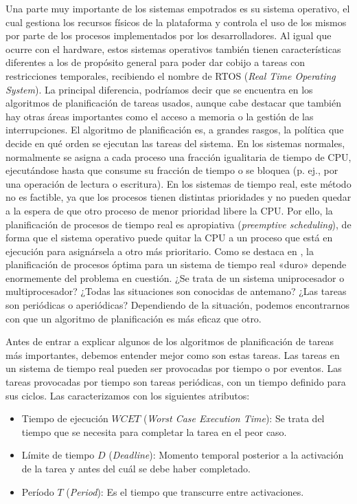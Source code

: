 Una parte muy importante de los sistemas empotrados es su sistema operativo, el
cual gestiona los recursos físicos de la plataforma y controla el uso de los
mismos por parte de los procesos implementados por los desarrolladores. Al igual
que ocurre con el hardware, estos sistemas operativos también tienen
características diferentes a los de propósito general para poder dar cobijo a
tareas con restricciones temporales, recibiendo el nombre de RTOS (\textit{Real
  Time Operating System}). La principal diferencia, podríamos decir que se
encuentra en los algoritmos de planificación de tareas usados, aunque cabe
destacar que también hay otras áreas importantes como el acceso a memoria o la
gestión de las interrupciones. El algoritmo de planificación es, a grandes
rasgos, la política que decide en qué orden se ejecutan las tareas del sistema.
En los sistemas normales, normalmente se asigna a cada proceso una fracción
igualitaria de tiempo de CPU, ejecutándose hasta que consume su fracción de
tiempo o se bloquea (p. ej., por una operación de lectura o escritura). En los
sistemas de tiempo real, este método no es factible, ya que los procesos tienen
distintas prioridades y no pueden quedar a la espera de que otro proceso de
menor prioridad libere la CPU. Por ello, la planificación de procesos de tiempo
real es apropiativa (\textit{preemptive scheduling}), de forma que el sistema
operativo puede quitar la CPU a un proceso que está en ejecución para
asignársela a otro más prioritario. Como se destaca en
\cite{burns_scheduling_1991}, la planificación de procesos óptima para un
sistema de tiempo real «duro» depende enormemente del problema en cuestión. ¿Se
trata de un sistema uniprocesador o multiprocesador? ¿Todas las situaciones son
conocidas de antemano? ¿Las tareas son periódicas o aperiódicas? Dependiendo de
la situación, podemos encontrarnos con que un algoritmo de planificación es más
eficaz que otro.

Antes de entrar a explicar algunos de los algoritmos de planificación de tareas
más importantes, debemos entender mejor como son estas tareas. Las tareas en un
sistema de tiempo real pueden ser provocadas por tiempo o por eventos. Las
tareas provocadas por tiempo son tareas periódicas, con un tiempo definido para
sus ciclos. Las caracterizamos con los siguientes atributos:

\begin{itemize}
  \item Tiempo de ejecución $WCET$ (\textit{Worst Case Execution Time}): Se trata
        del tiempo que se necesita para completar la tarea en el peor caso.
  \item Límite de tiempo $D$ (\textit{Deadline}): Momento temporal posterior a
        la activación de la tarea y antes del cuál se debe haber completado.
  \item Período $T$ (\textit{Period}): Es el tiempo que transcurre entre
        activaciones.
\end{itemize}

